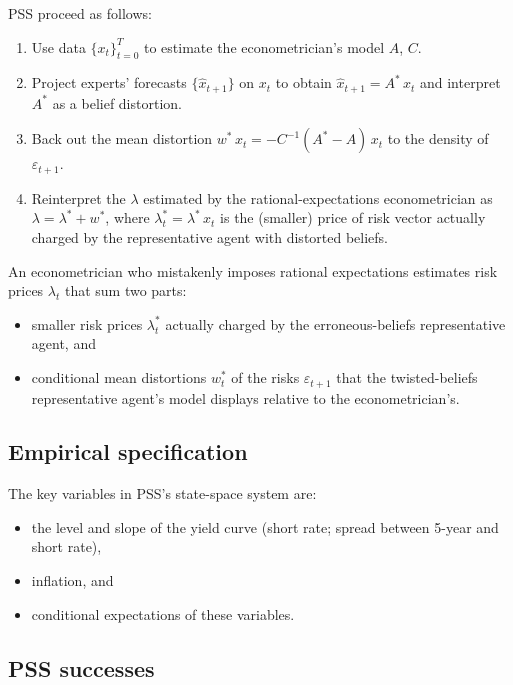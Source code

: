 \documentclass[12pt]{article}
\theoremstyle{definition}
\begin{document}
PSS proceed as follows:
\begin{enumerate}
\item Use data $\{x_t\}_{t=0}^T$ to estimate the econometrician's model
      $A$, $C$.
\item Project experts' forecasts $\{\hat x_{t+1}\}$ on $x_t$ to obtain
      $\hat x_{t+1} = A^*\, x_t$ and interpret $A^*$ as a belief
      distortion.
\item Back out the mean distortion
      $w^*\, x_t = -C^{-1}(A^* - A)\, x_t$ to the density of
      $\varepsilon_{t+1}$.
\item Reinterpret the $\lambda$ estimated by the rational-expectations
      econometrician as $\lambda = \lambda^* + w^*$, where
      $\lambda_t^* = \lambda^*\, x_t$ is the (smaller) price of risk
      vector actually charged by the representative agent with distorted
      beliefs.
\end{enumerate}

An econometrician who mistakenly imposes rational expectations estimates
risk prices $\lambda_t$ that sum two parts:
\begin{itemize}
\item smaller risk prices $\lambda_t^*$ actually charged by the
      erroneous-beliefs representative agent, and
\item conditional mean distortions $w_t^*$ of the risks
      $\varepsilon_{t+1}$ that the twisted-beliefs representative
      agent's model displays relative to the econometrician's.
\end{itemize}

\subsection{Empirical specification}

The key variables in PSS's state-space system are:
\begin{itemize}
\item the level and slope of the yield curve (short rate; spread between
      5-year and short rate),
\item inflation, and
\item conditional expectations of these variables.
\end{itemize}

\subsection{PSS successes}
\end{document}
